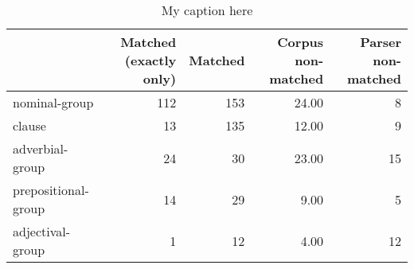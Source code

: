 \begin{table}[!ht]
\centering
\begin{tabular}{lrrrr}
\toprule
{} &  Matched (exactly only) &  Matched &  Corpus non-matched &  Parser non-matched \\
\midrule
nominal-group       &                     112 &      153 &               24.00 &                   8 \\
clause              &                      13 &      135 &               12.00 &                   9 \\
adverbial-group     &                      24 &       30 &               23.00 &                  15 \\
prepositional-group &                      14 &       29 &                9.00 &                   5 \\
adjectival-group    &                       1 &       12 &                4.00 &                  12 \\
\bottomrule
\end{tabular}
\caption{My caption here}
\label{tab:unit-types-ocd-data}
\end{table}